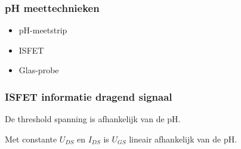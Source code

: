     \begin{frame}
        \frametitle{pH meettechnieken}
    
        \begin{itemize}
            \item pH-meetstrip
            \item ISFET
            \item Glas-probe
        \end{itemize}
        
    \end{frame}

    \begin{frame}
        \frametitle{ISFET informatie dragend signaal}

        De threshold spanning is afhankelijk van de pH.

        Met constante $U_{DS}$ en $I_{DS}$ is $U_{GS}$ lineair afhankelijk van de pH.
    
    
    \end{frame}